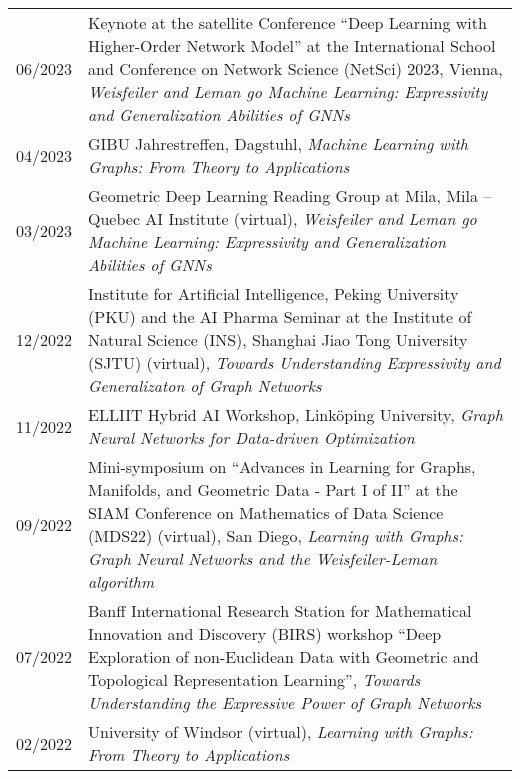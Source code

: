 \documentclass[11pt, a4paper, DIV=14, headings=small]{scrartcl}
\begin{document}
\begin{longtabu}{p{2.1cm}p{12.0cm}}
		06/2023 & Keynote at the satellite Conference ``Deep Learning with Higher-Order Network Model'' at the International School
		and Conference on Network Science (NetSci) 2023, Vienna, \emph{Weisfeiler and Leman go Machine Learning: Expressivity and Generalization Abilities of GNNs}\\                                                                                                                     
		04/2023 & GIBU Jahrestreffen, Dagstuhl, \emph{Machine Learning with Graphs: From Theory to Applications}                                                                                                                                                                                \\
		03/2023 & Geometric Deep Learning Reading Group at Mila, Mila -- Quebec AI Institute (virtual), \emph{Weisfeiler and Leman go Machine Learning: Expressivity and Generalization Abilities of GNNs}\\
		12/2022 & Institute for Artificial Intelligence, Peking University (PKU) and the AI Pharma Seminar at the Institute of Natural Science (INS), Shanghai Jiao Tong University (SJTU) (virtual), \emph{Towards Understanding Expressivity and Generalizaton of Graph Networks}            \\
		11/2022 & ELLIIT Hybrid AI Workshop, Linköping University, \emph{Graph Neural Networks for Data-driven Optimization}                                                                                                                                                                    \\
		09/2022 & Mini-symposium on ``Advances in Learning for Graphs, Manifolds, and Geometric Data - Part I of II'' at the SIAM Conference on Mathematics of Data Science (MDS22) (virtual), San Diego, \emph{Learning with Graphs: Graph Neural Networks and the Weisfeiler-Leman algorithm} \\
		07/2022 & Banff International Research Station for Mathematical Innovation and Discovery (BIRS) workshop ``Deep Exploration of non-Euclidean Data with Geometric and Topological Representation Learning'',  \emph{Towards Understanding the Expressive Power of Graph Networks}        \\
		02/2022 & University of Windsor (virtual), \emph{Learning with Graphs: From Theory to Applications}                                                                                                                                                                                     \\

\end{longtabu}
\end{document}
